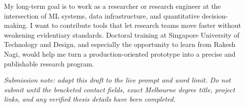 \documentclass[11pt]{article}
\begin{document}
My long-term goal is to work as a researcher or research engineer at the intersection of ML systems, data infrastructure, and quantitative decision-making. I want to contribute tools that let research teams move faster without weakening evidentiary standards. Doctoral training at Singapore University of Technology and Design, and especially the opportunity to learn from Rakesh Nagi, would help me turn a production-oriented prototype into a precise and publishable research program.

\textit{Submission note: adapt this draft to the live prompt and word limit. Do not submit until the bracketed contact fields, exact Melbourne degree title, project links, and any verified thesis details have been completed.}
\end{document}
